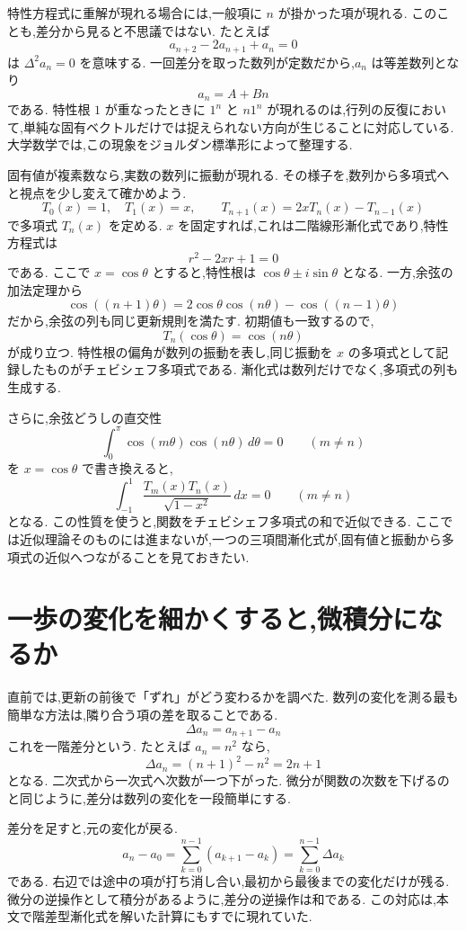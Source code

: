 特性方程式に重解が現れる場合には,一般項に $n$ が掛かった項が現れる.
このことも,差分から見ると不思議ではない.
たとえば
\[
  a_{n+2}-2a_{n+1}+a_n=0
\]
は $\Delta^2a_n=0$ を意味する.
一回差分を取った数列が定数だから,$a_n$ は等差数列となり
\[
  a_n=A+Bn
\]
である.
特性根 $1$ が重なったときに $1^n$ と $n1^n$ が現れるのは,行列の反復において,単純な固有ベクトルだけでは捉えられない方向が生じることに対応している.
大学数学では,この現象をジョルダン標準形によって整理する.

固有値が複素数なら,実数の数列に振動が現れる.
その様子を,数列から多項式へと視点を少し変えて確かめよう.
\[
  T_0(x)=1,\quad T_1(x)=x,\qquad
  T_{n+1}(x)=2xT_n(x)-T_{n-1}(x)
\]
で多項式 $T_n(x)$ を定める.
$x$ を固定すれば,これは二階線形漸化式であり,特性方程式は
\[
  r^2-2xr+1=0
\]
である.
ここで $x=\cos\theta$ とすると,特性根は
$\cos\theta\pm i\sin\theta$ となる.
一方,余弦の加法定理から
\[
  \cos((n+1)\theta)
  =2\cos\theta\cos(n\theta)-\cos((n-1)\theta)
\]
だから,余弦の列も同じ更新規則を満たす.
初期値も一致するので,
\[
  T_n(\cos\theta)=\cos(n\theta)
\]
が成り立つ.
特性根の偏角が数列の振動を表し,同じ振動を $x$ の多項式として記録したものがチェビシェフ多項式である.
漸化式は数列だけでなく,多項式の列も生成する.

さらに,余弦どうしの直交性
\[
  \int_0^\pi \cos(m\theta)\cos(n\theta)\,d\theta=0
  \qquad(m\ne n)
\]
を $x=\cos\theta$ で書き換えると,
\[
  \int_{-1}^{1}
  \frac{T_m(x)T_n(x)}{\sqrt{1-x^2}}\,dx=0
  \qquad(m\ne n)
\]
となる.
この性質を使うと,関数をチェビシェフ多項式の和で近似できる.
ここでは近似理論そのものには進まないが,一つの三項間漸化式が,固有値と振動から多項式の近似へつながることを見ておきたい.

\section{一歩の変化を細かくすると,微積分になるか}

直前では,更新の前後で「ずれ」がどう変わるかを調べた.
数列の変化を測る最も簡単な方法は,隣り合う項の差を取ることである.
\[
  \Delta a_n=a_{n+1}-a_n
\]
これを一階差分という.
たとえば $a_n=n^2$ なら,
\[
  \Delta a_n=(n+1)^2-n^2=2n+1
\]
となる.
二次式から一次式へ次数が一つ下がった.
微分が関数の次数を下げるのと同じように,差分は数列の変化を一段簡単にする.

差分を足すと,元の変化が戻る.
\[
  a_n-a_0
  =\sum_{k=0}^{n-1}(a_{k+1}-a_k)
  =\sum_{k=0}^{n-1}\Delta a_k
\]
である.
右辺では途中の項が打ち消し合い,最初から最後までの変化だけが残る.
微分の逆操作として積分があるように,差分の逆操作は和である.
この対応は,本文で階差型漸化式を解いた計算にもすでに現れていた.

